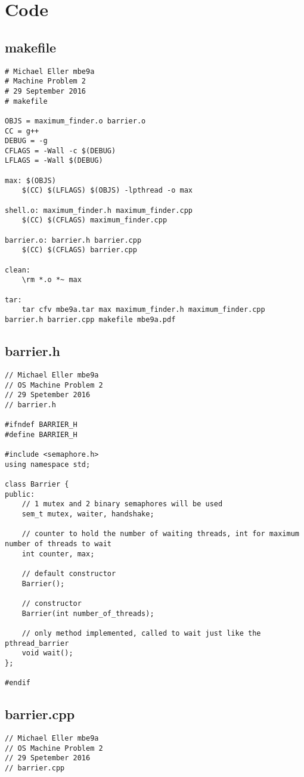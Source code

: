 \documentclass[12pt,letter,titlepage]{article}
\begin{document}
\pagebreak
\section*{Code}
\subsection*{makefile}{
\scriptsize{
\begin{verbatim}
# Michael Eller mbe9a
# Machine Problem 2
# 29 September 2016
# makefile

OBJS = maximum_finder.o barrier.o
CC = g++
DEBUG = -g
CFLAGS = -Wall -c $(DEBUG)
LFLAGS = -Wall $(DEBUG)

max: $(OBJS)
	$(CC) $(LFLAGS) $(OBJS) -lpthread -o max

shell.o: maximum_finder.h maximum_finder.cpp
	$(CC) $(CFLAGS) maximum_finder.cpp

barrier.o: barrier.h barrier.cpp
	$(CC) $(CFLAGS) barrier.cpp

clean:
	\rm *.o *~ max

tar:
	tar cfv mbe9a.tar max maximum_finder.h maximum_finder.cpp barrier.h barrier.cpp makefile mbe9a.pdf
\end{verbatim}

\subsection*{barrier.h}{
\scriptsize{
\begin{verbatim}
// Michael Eller mbe9a
// OS Machine Problem 2
// 29 Spetember 2016
// barrier.h

#ifndef BARRIER_H
#define BARRIER_H

#include <semaphore.h>
using namespace std;

class Barrier {
public:
	// 1 mutex and 2 binary semaphores will be used
	sem_t mutex, waiter, handshake;

	// counter to hold the number of waiting threads, int for maximum number of threads to wait
	int counter, max;

	// default constructor
	Barrier();

	// constructor
	Barrier(int number_of_threads);

	// only method implemented, called to wait just like the pthread_barrier
	void wait();
};

#endif
\end{verbatim}
}
}
\pagebreak
\subsection*{barrier.cpp}{
\scriptsize{
\begin{verbatim}
// Michael Eller mbe9a
// OS Machine Problem 2
// 29 Spetember 2016
// barrier.cpp


\end{verbatim}}}}}
\end{document}
